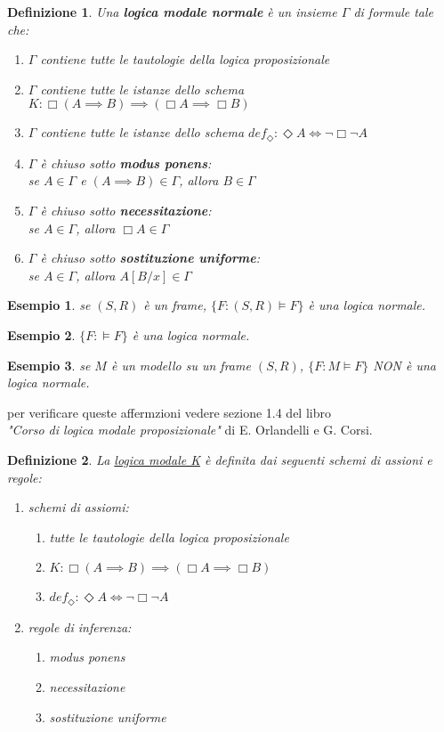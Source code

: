 \documentclass[a4paper,12pt]{article}
\theoremstyle{def}
\newtheorem*{definition}{Definizione}
\theoremstyle{prop}
\theoremstyle{esempio}
\newtheorem*{example}{Esempio}
\theoremstyle{dimostrazione}
\theoremstyle{teo}
\theoremstyle{osservazione}
\begin{document}
\begin{definition}
	Una \textbf{logica modale normale} è un insieme \(\Gamma\) di formule tale che:
	\begin{enumerate}
		\item \(\Gamma\) contiene tutte le tautologie della logica proposizionale
		\item \(\Gamma\) contiene tutte le istanze dello schema \(K: \Box (A \implies B) \implies (\Box A \implies \Box B)\)
		\item \(\Gamma\) contiene tutte le istanze dello schema \(def_\Diamond : \Diamond A \iff \neg \Box \neg A\)
		\item \(\Gamma\) è chiuso sotto \textbf{modus ponens}:\\
				se \(A \in \Gamma\) e \((A \implies B) \in \Gamma\), allora \(B \in \Gamma\)
		\item \(\Gamma\) è chiuso sotto \textbf{necessitazione}:\\
				se \(A \in \Gamma\), allora \(\Box A \in \Gamma\)
		\item \(\Gamma\) è chiuso sotto \textbf{sostituzione uniforme}:\\
				se \(A \in \Gamma\), allora \(A[B/x] \in \Gamma\)
	\end{enumerate}
\end{definition}
\begin{example}
	se \((S,R)\) è un frame, \(\{F: (S,R) \vDash F\}\) è una logica normale.
\end{example}
\begin{example}
	\(\{F: \vDash F\}\) è una logica normale.
\end{example}
\begin{example}
	se \(M\) è un modello su un frame \((S,R)\), \(\{F: M \vDash F\}\) NON è una logica normale.
\end{example}
per verificare queste affermzioni vedere sezione 1.4 del libro\\
\textit{"Corso di logica modale proposizionale"} di E. Orlandelli e G. Corsi.\\
\newpage
\begin{definition}
	La \underline{logica modale K} è definita dai seguenti schemi di assioni e regole:
	\begin{enumerate}
		\item schemi di assiomi:
				\begin{enumerate}
					\item tutte le tautologie della logica proposizionale
					\item \(K: \Box (A \implies B) \implies (\Box A \implies \Box B)\)
					\item \(def_\Diamond : \Diamond A \iff \neg \Box \neg A\)
				\end{enumerate}
		\item regole di inferenza:
				\begin{enumerate}
					\item modus ponens
					\item necessitazione
					\item sostituzione uniforme
				\end{enumerate}
	\end{enumerate}
\end{definition}
\end{document}
